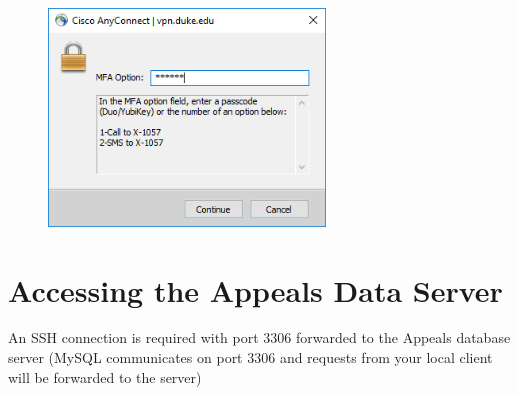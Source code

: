 \documentclass[10pt, letterpaper]{article}
\begin{document}
\begin{spacing}{1.0}
\begin{itemize}
    \begin{figure}[H]
        \includegraphics[width=2.9in]{VPN03.png}
        \centering
        \caption*{}
        \label{}
    \end{figure}  
\end{itemize}

\newpage

\section{Accessing the Appeals Data Server}\vspace{-2pt}

An SSH connection is required with port 3306 forwarded to the Appeals database server (MySQL communicates on port 3306 and requests from your local client will be forwarded to the server)

\begin{itemize}


\end{itemize}
\end{spacing}
\end{document}
